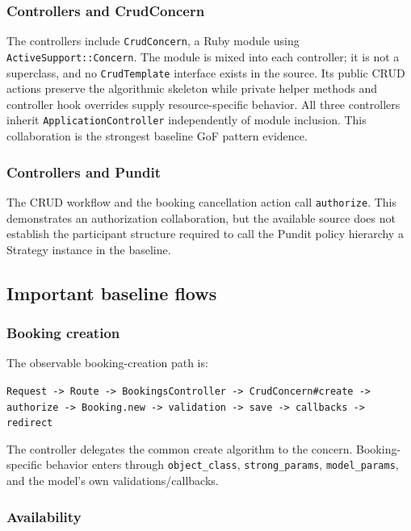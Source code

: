 \documentclass[10pt,a4paper]{article}
\newcommand{\code}[1]{\texttt{\small #1}}
\begin{document}
\subsubsection{Controllers and CrudConcern}

The controllers include \code{CrudConcern}, a Ruby module using \code{ActiveSupport::Concern}. The module is mixed into each controller; it is not a superclass, and no \code{CrudTemplate} interface exists in the source. Its public CRUD actions preserve the algorithmic skeleton while private helper methods and controller hook overrides supply resource-specific behavior. All three controllers inherit \code{ApplicationController} independently of module inclusion. This collaboration is the strongest baseline GoF pattern evidence.

\subsubsection{Controllers and Pundit}

The CRUD workflow and the booking cancellation action call \code{authorize}. This demonstrates an authorization collaboration, but the available source does not establish the participant structure required to call the Pundit policy hierarchy a Strategy instance in the baseline.

\subsection{Important baseline flows}

\subsubsection{Booking creation}

The observable booking-creation path is:

\begin{center}
\code{Request -> Route -> BookingsController -> CrudConcern\#create -> authorize -> Booking.new -> validation -> save -> callbacks -> redirect}
\end{center}

The controller delegates the common create algorithm to the concern. Booking-specific behavior enters through \code{object\_class}, \code{strong\_params}, \code{model\_params}, and the model's own validations/callbacks.

\subsubsection{Availability}
\end{document}
